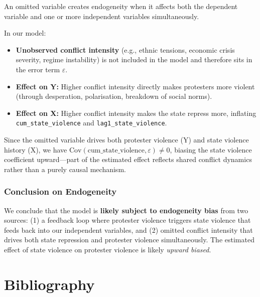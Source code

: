 \documentclass[12pt,a4paper]{article}
\begin{document}
An omitted variable creates endogeneity when it affects both the dependent variable and one or more independent variables simultaneously.

In our model:
\begin{itemize}
  \item \textbf{Unobserved conflict intensity} (e.g., ethnic tensions, economic crisis severity, regime instability) is not included in the model and therefore sits in the error term $\varepsilon$.
  \item \textbf{Effect on Y:} Higher conflict intensity directly makes protesters more violent (through desperation, polarisation, breakdown of social norms).
  \item \textbf{Effect on X:} Higher conflict intensity makes the state repress more, inflating \texttt{cum\_state\_violence} and \texttt{lag1\_state\_violence}.
\end{itemize}

Since the omitted variable drives both protester violence (Y) and state violence history (X), we have $\text{Cov}(\text{cum\_state\_violence}, \varepsilon) \neq 0$, biasing the state violence coefficient upward---part of the estimated effect reflects shared conflict dynamics rather than a purely causal mechanism.


\subsubsection{Conclusion on Endogeneity}

We conclude that the model is \textbf{likely subject to endogeneity bias} from two sources: (1) a feedback loop where protester violence triggers state violence that feeds back into our independent variables, and (2) omitted conflict intensity that drives both state repression and protester violence simultaneously. The estimated effect of state violence on protester violence is likely \emph{upward biased}.



\section*{Bibliography}
\end{document}
